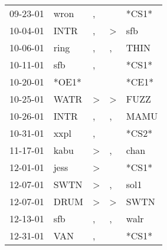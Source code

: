 \begin{supertabular}{p{0.07\textwidth}p{0.06\textwidth}p{0.02\textwidth}p{0.02\textwidth}p{0.06\textwidth}}
          09-23-01\textsuperscript{} &           wron\textsuperscript{} &                , &                  &                            *CS1* \\
          10-04-01\textsuperscript{} &           INTR\textsuperscript{} &                , &     \textgreater &            sfb\textsuperscript{} \\
          10-06-01\textsuperscript{} &           ring\textsuperscript{} &                , &                , &           THIN\textsuperscript{} \\
          10-11-01\textsuperscript{} &            sfb\textsuperscript{} &                , &                  &                            *CS1* \\
          10-20-01\textsuperscript{} &                            *OE1* &                  &                  &                            *CE1* \\
          10-25-01\textsuperscript{} &           WATR\textsuperscript{} &     \textgreater &     \textgreater &           FUZZ\textsuperscript{} \\
          10-26-01\textsuperscript{} &           INTR\textsuperscript{} &                , &                , &           MAMU\textsuperscript{} \\
          10-31-01\textsuperscript{} &           xxpl\textsuperscript{} &                , &                  &                            *CS2* \\
          11-17-01\textsuperscript{} &           kabu\textsuperscript{} &     \textgreater &                , &           chan\textsuperscript{} \\
          12-01-01\textsuperscript{} &           jess\textsuperscript{} &     \textgreater &                  &                            *CS1* \\
          12-07-01\textsuperscript{} &           SWTN\textsuperscript{} &     \textgreater &                , &           sol1\textsuperscript{} \\
          12-07-01\textsuperscript{} &           DRUM\textsuperscript{} &     \textgreater &     \textgreater &           SWTN\textsuperscript{} \\
          12-13-01\textsuperscript{} &            sfb\textsuperscript{} &                , &                , &           walr\textsuperscript{} \\
          12-31-01\textsuperscript{} &            VAN\textsuperscript{} &                , &                  &                            *CS1* \\

\end{supertabular}
